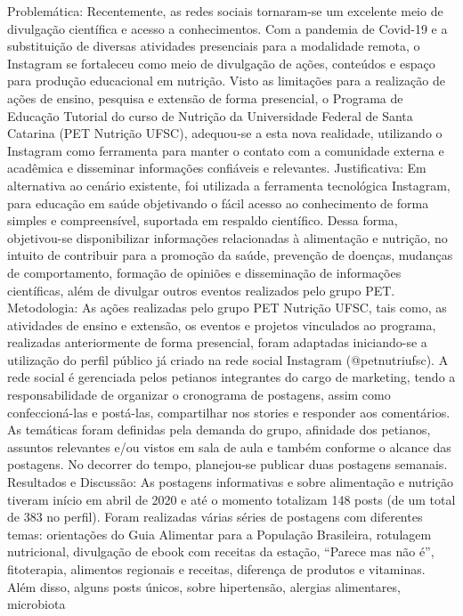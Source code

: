 Problemática: Recentemente, as redes sociais tornaram-se um excelente meio de divulgação
científica e acesso a conhecimentos. Com a pandemia de Covid-19 e a substituição de diversas
atividades presenciais para a modalidade remota, o Instagram se fortaleceu como meio de
divulgação de ações, conteúdos e espaço para produção educacional em nutrição. Visto as
limitações para a realização de ações de ensino, pesquisa e extensão de forma presencial, o
Programa de Educação Tutorial do curso de Nutrição da Universidade Federal de Santa Catarina
(PET Nutrição UFSC), adequou-se a esta nova realidade, utilizando o Instagram como
ferramenta para manter o contato com a comunidade externa e acadêmica e disseminar
informações confiáveis e relevantes.
Justificativa: Em alternativa ao cenário existente, foi utilizada a ferramenta tecnológica
Instagram, para educação em saúde objetivando o fácil acesso ao conhecimento de forma
simples e compreensível, suportada em respaldo científico. Dessa forma, objetivou-se
disponibilizar informações relacionadas à alimentação e nutrição, no intuito de contribuir para a
promoção da saúde, prevenção de doenças, mudanças de comportamento, formação de opiniões
e disseminação de informações científicas, além de divulgar outros eventos realizados pelo grupo
PET.
Metodologia: As ações realizadas pelo grupo PET Nutrição UFSC, tais como, as atividades de
ensino e extensão, os eventos e projetos vinculados ao programa, realizadas anteriormente de
forma presencial, foram adaptadas iniciando-se a utilização do perfil público já criado na rede
social Instagram (@petnutriufsc). A rede social é gerenciada pelos petianos integrantes do cargo
de marketing, tendo a responsabilidade de organizar o cronograma de postagens, assim como
confeccioná-las e postá-las, compartilhar nos stories e responder aos comentários. As temáticas
foram definidas pela demanda do grupo, afinidade dos petianos, assuntos relevantes e/ou vistos
em sala de aula e também conforme o alcance das postagens. No decorrer do tempo, planejou-se
publicar duas postagens semanais.
Resultados e Discussão: As postagens informativas e sobre alimentação e nutrição tiveram
início em abril de 2020 e até o momento totalizam 148 posts (de um total de 383 no perfil).
Foram realizadas várias séries de postagens com diferentes temas: orientações do Guia
Alimentar para a População Brasileira, rotulagem nutricional, divulgação de ebook com receitas
da estação, “Parece mas não é”, fitoterapia, alimentos regionais e receitas, diferença de produtos
e vitaminas. Além disso, alguns posts únicos, sobre hipertensão, alergias alimentares, microbiota
